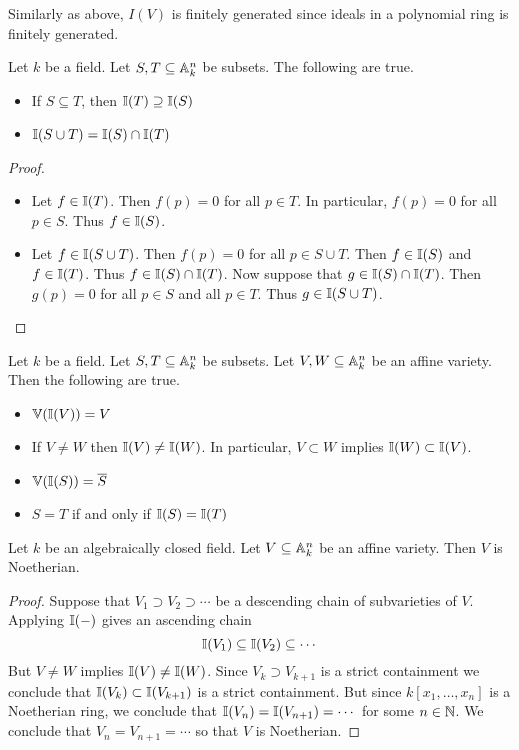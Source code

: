 \documentclass[a4paper]{article}
\begin{document}
Similarly as above, $I(V)$ is finitely generated since ideals in a polynomial ring is finitely generated. 

\begin{prp}{}{} Let $k$ be a field. Let $S,T\subseteq\mathbb{A}_k^n$ be subsets. The following are true. 
\begin{itemize}
\item If $S\subseteq T$, then $\mathbb{I}(T)\supseteq\mathbb{I}(S)$
\item $\mathbb{I}(S\cup T)=\mathbb{I}(S)\cap\mathbb{I}(T)$
\end{itemize} \tcbline
\begin{proof}~\\
\begin{itemize}
\item Let $f\in\mathbb{I}(T)$. Then $f(p)=0$ for all $p\in T$. In particular, $f(p)=0$ for all $p\in S$. Thus $f\in\mathbb{I}(S)$. 
\item Let $f\in\mathbb{I}(S\cup T)$. Then $f(p)=0$ for all $p\in S\cup T$. Then $f\in\mathbb{I}(S)$ and $f\in\mathbb{I}(T)$. Thus $f\in\mathbb{I}(S)\cap\mathbb{I}(T)$. Now suppose that $g\in\mathbb{I}(S)\cap\mathbb{I}(T)$. Then $g(p)=0$ for all $p\in S$ and all $p\in T$. Thus $g\in\mathbb{I}(S\cup T)$. 
\end{itemize}
\end{proof}
\end{prp}

\begin{lmm}{}{} Let $k$ be a field. Let $S,T\subseteq\mathbb{A}_k^n$ be subsets. Let $V,W\subseteq\mathbb{A}_k^n$ be an affine variety. Then the following are true. 
\begin{itemize}
\item $\mathbb{V}(\mathbb{I}(V))=V$
\item If $V\neq W$ then $\mathbb{I}(V)\neq\mathbb{I}(W)$. In particular, $V\subset W$ implies $\mathbb{I}(W)\subset\mathbb{I}(V)$. 
\item $\mathbb{V}(\mathbb{I}(S))=\overline{S}$
\item $S=T$ if and only if $\mathbb{I}(S)=\mathbb{I}(T)$
\end{itemize}
\end{lmm}

\begin{prp}{}{} Let $k$ be an algebraically closed field. Let $V\subseteq\mathbb{A}_k^n$ be an affine variety. Then $V$ is Noetherian. \tcbline
\begin{proof}
Suppose that $V_1\supset V_2\supset\cdots$ be a descending chain of subvarieties of $V$. Applying $\mathbb{I}(-)$ gives an ascending chain $$\mathbb{I}(V_1)\subseteq\mathbb{I}(V_2)\subseteq\cdots$$ But $V\neq W$ implies $\mathbb{I}(V)\neq\mathbb{I}(W)$. Since $V_k\supset V_{k+1}$ is a strict containment we conclude that $\mathbb{I}(V_k)\subset\mathbb{I}(V_{k+1})$ is a strict containment. But since $k[x_1,\dots,x_n]$ is a Noetherian ring, we conclude that $\mathbb{I}(V_n)=\mathbb{I}(V_{n+1})=\cdots$ for some $n\in\mathbb{N}$. We conclude that $V_n=V_{n+1}=\cdots$ so that $V$ is Noetherian. 
\end{proof}
\end{prp}
\end{document}
